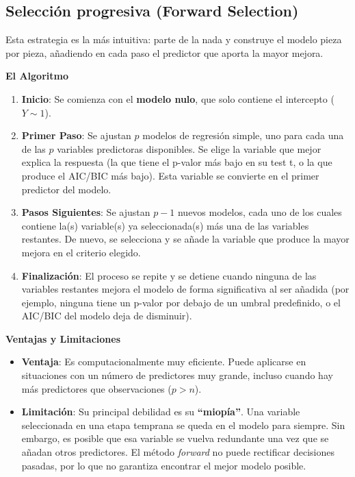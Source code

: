 \documentclass[
  letterpaper,
  DIV=11,
  numbers=noendperiod]{scrreprt}
\providecommand{\tightlist}{%
  \setlength{\itemsep}{0pt}\setlength{\parskip}{0pt}}
\begin{document}
\subsection{Selección progresiva (Forward
Selection)}\label{selecciuxf3n-progresiva-forward-selection}

Esta estrategia es la más intuitiva: parte de la nada y construye el
modelo pieza por pieza, añadiendo en cada paso el predictor que aporta
la mayor mejora.

\textbf{El Algoritmo}

\begin{enumerate}
\def\labelenumi{\arabic{enumi}.}
\tightlist
\item
  \textbf{Inicio}: Se comienza con el \textbf{modelo nulo}, que solo
  contiene el intercepto (\(Y \sim 1\)).
\item
  \textbf{Primer Paso}: Se ajustan \(p\) modelos de regresión simple,
  uno para cada una de las \(p\) variables predictoras disponibles. Se
  elige la variable que mejor explica la respuesta (la que tiene el
  p-valor más bajo en su test t, o la que produce el AIC/BIC más bajo).
  Esta variable se convierte en el primer predictor del modelo.
\item
  \textbf{Pasos Siguientes}: Se ajustan \(p-1\) nuevos modelos, cada uno
  de los cuales contiene la(s) variable(s) ya seleccionada(s) más una de
  las variables restantes. De nuevo, se selecciona y se añade la
  variable que produce la mayor mejora en el criterio elegido.
\item
  \textbf{Finalización}: El proceso se repite y se detiene cuando
  ninguna de las variables restantes mejora el modelo de forma
  significativa al ser añadida (por ejemplo, ninguna tiene un p-valor
  por debajo de un umbral predefinido, o el AIC/BIC del modelo deja de
  disminuir).
\end{enumerate}

\textbf{Ventajas y Limitaciones}

\begin{itemize}
\tightlist
\item
  \textbf{Ventaja}: Es computacionalmente muy eficiente. Puede aplicarse
  en situaciones con un número de predictores muy grande, incluso cuando
  hay más predictores que observaciones (\(p > n\)).
\item
  \textbf{Limitación}: Su principal debilidad es su \textbf{``miopía''}.
  Una variable seleccionada en una etapa temprana se queda en el modelo
  para siempre. Sin embargo, es posible que esa variable se vuelva
  redundante una vez que se añadan otros predictores. El método
  \emph{forward} no puede rectificar decisiones pasadas, por lo que no
  garantiza encontrar el mejor modelo posible.
\end{itemize}
\end{document}
